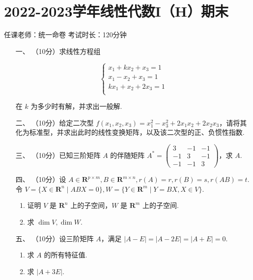\section*{2022-2023学年线性代数I（H）期末}

\begin{center}
    任课老师：统一命卷\hspace{4em} 考试时长：120分钟
\end{center}

\begin{enumerate}
	\item[一、]（10分）求线性方程组

	\[\left\{\begin{matrix}
	  x_1+kx_2+x_3= 1\\
	  x_1-x_2+x_3= 1 \\
	  kx_1+x_2+2x_3= 1 \\
	\end{matrix}\right.\]

	在 $k$ 为多少时有解，并求出一般解.
	\item[二、]（10分）给定二次型 $f(x_1,x_2,x_3)=x_1^2-x_3^2+2x_1x_2+2x_2x_3$，请将其化为标准型，并求出此时的线性变换矩阵，以及该二次型的正、负惯性指数.
	\item[三、] （10分）已知三阶矩阵 $A$ 的伴随矩阵 $A^*=\begin{pmatrix}
		3 & -1 &- 1\\
		-1 & 3 & -1\\
		-1 & -1 & 3
	  \end{pmatrix} $，求 $A$.
	\item[四、]（10分）设 $A\in \mathbf R^{p\times m},B\in \mathbf R^{m\times n},r(A)=r,r(B)=s,r(AB)=t$. 令 $V=\{X\in \mathbf R^n\mid ABX=0\},W=\{Y\in \mathbf R^m\mid Y=BX,X\in V\}$.
      \begin{enumerate}[label=(\arabic*)]
        \item 证明 $V$ 是 $\mathbf R^n$ 上的子空间，$W$ 是 $\mathbf R^m$ 上的子空间.
        \item 求 $\dim V,\dim W$.
      \end{enumerate}

	\item[五、]（10分）设三阶矩阵 $A$，满足 $|A-E|=|A-2E|=|A+E|=0$.
      \begin{enumerate}[label=(\arabic*)]
        \item 求 $A$ 的所有特征值.
        \item 求 $|A+3E|$.
      \end{enumerate}


\end{enumerate}
